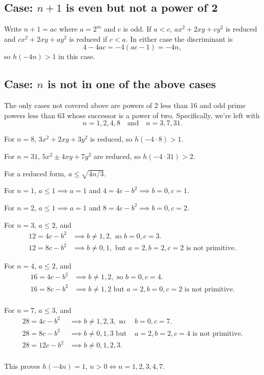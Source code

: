 \subsection{Case: $n+1$ is even but not a power of 2}

Write $n+1 = ac$ where $a = 2^m$ and $c$ is odd. If $a<c$, $ax^2+2xy+cy^2$ is reduced and $cx^2+2xy+ay^2$ is reduced if $c<a$. In either case the discriminant is
\[4-4ac=-4(ac-1)=-4n,\]
so $h(-4n)>1$ in this case.

\subsection{Case: $n$ is not in one of the above cases}

The only cases not covered above are powers of 2 less than 16 and odd prime powers less than 63 whose successor is a power of two. Specifically, we're left with
\[n=1, 2, 4, 8\quad\textrm{and}\quad n=3, 7, 31.\]

For $n=8$, $3x^2+2xy+3y^2$ is reduced, so $h(-4\cdot 8)>1$.

For $n=31$, $5x^2\pm 4xy+7y^2$ are reduced, so $h(-4\cdot 31)>2$.

For a reduced form, $a\leq\sqrt{4n/3}$.

For $n=1$, $a\leq 1\implies a=1$ and $4=4c-b^2\implies b=0, c=1$.

For $n=2$, $a\leq 1\implies a=1$ and $8=4c-b^2\implies b=0, c=2$.

For $n=3$, $a\leq 2$, and
\begin{align*}
12=4c-b^2&\implies b\neq 1,2,\textrm{ so }b=0,c=3.\\
12=8c-b^2&\implies b\neq 0,1,\textrm{ but }a=2, b=2, c=2\textrm{ is not primitive.}
\end{align*}

For $n=4$, $a\leq 2$, and
\begin{align*}
16=4c-b^2&\implies b\neq 1,2,\textrm{ so }b=0,c=4.\\
16=8c-b^2&\implies b\neq 1,2\textrm{ but }a=2, b=0, c=2\textrm{ is not primitive.}\\
\end{align*}

For $n=7$, $a\leq 3$, and
\begin{align*}
28=4c-b^2&\implies b\neq 1,2,3,\textrm{ so }&b=0,c=7.\\
28=8c-b^2&\implies b\neq 0,1,3\textrm{ but }&a=2, b=2, c=4\textrm{ is not primitive.}\\
28=12c-b^2&\implies b\neq 0,1,2,3.\\
\end{align*}

This proves $h(-4n)=1$, $n>0\iff n=1, 2, 3, 4, 7$.



